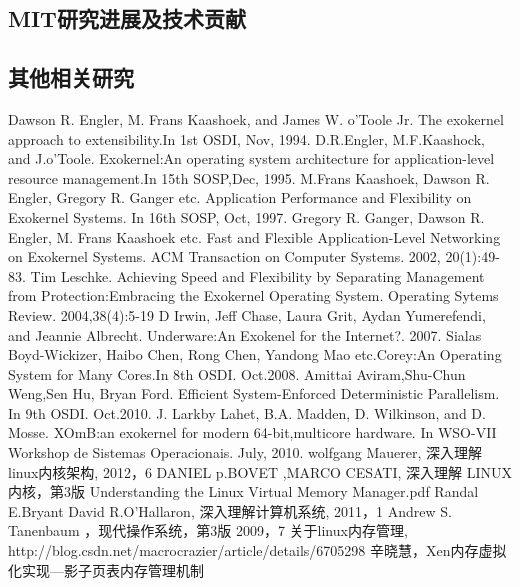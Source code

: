 \documentclass[12pt,openany,a4paper]{report}
\begin{document}
		\subsection{MIT研究进展及技术贡献}
		\subsection{其他相关研究}
%
{}
\begin{thebibliography}{99}

	 Dawson R. Engler, M. Frans Kaashoek, and James W. o'Toole Jr. The exokernel approach to extensibility.In 1st OSDI, Nov, 1994.
	 D.R.Engler, M.F.Kaashock, and J.o'Toole. Exokernel:An operating system architecture for application-level resource management.In 15th SOSP,Dec, 1995.
	 M.Frans Kaashoek, Dawson R. Engler, Gregory R. Ganger etc. Application Performance and Flexibility on Exokernel Systems. In 16th SOSP, Oct, 1997.
	 Gregory R. Ganger, Dawson R. Engler, M. Frans Kaashoek etc. Fast and Flexible Application-Level Networking on Exokernel Systems. ACM Transaction on Computer Systems. 2002, 20(1):49-83.
	 Tim Leschke. Achieving Speed and Flexibility by Separating Management from Protection:Embracing the Exokernel Operating System. Operating Sytems Review. 2004,38(4):5-19
	 D Irwin, Jeff Chase, Laura Grit, Aydan Yumerefendi, and Jeannie Albrecht. Underware:An Exokenel for the Internet?. 2007.
	 Sialas Boyd-Wickizer, Haibo Chen, Rong Chen, Yandong Mao etc.Corey:An Operating System for Many Cores.In 8th OSDI. Oct.2008.
	 Amittai Aviram,Shu-Chun Weng,Sen Hu, Bryan Ford. Efficient System-Enforced Deterministic Parallelism. In 9th OSDI. Oct.2010.
	 J. Larkby Lahet, B.A. Madden, D. Wilkinson, and D. Mosse. XOmB:an exokernel for modern 64-bit,multicore hardware. In WSO-VII Workshop de Sistemas Operacionais. July, 2010.
	wolfgang Mauerer, 深入理解linux内核架构, 2012，6
	DANIEL p.BOVET ,MARCO CESATI, 深入理解 LINUX 内核，第3版
	Understanding the Linux Virtual Memory Manager.pdf
	Randal E.Bryant David R.O'Hallaron, 深入理解计算机系统, 2011，1
	Andrew S. Tanenbaum ，现代操作系统，第3版  2009，7
	关于linux内存管理, http://blog.csdn.net/macrocrazier/article/details/6705298
	辛晓慧，Xen内存虚拟化实现---影子页表内存管理机制  
\end{thebibliography}
\end{document}
